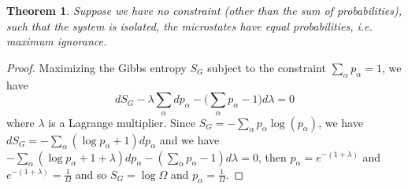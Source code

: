 \documentclass[a4paper]{article}
\theoremstyle{new}
\newtheorem{thm}{Theorem}[section]
\begin{document}
\begin{thm}
Suppose we have no constraint (other than the sum of probabilities), such that the system is isolated, the microstates have equal probabilities, i.e. maximum ignorance. 
\end{thm}
\begin{proof}
Maximizing the Gibbs entropy $S_G$ subject to the constraint $\sum_\alpha p_\alpha=1$, we have
$$dS_G-\lambda\sum_\alpha dp_\alpha-\bigg(\sum_\alpha p_\alpha-1\bigg)d\lambda=0$$
where $\lambda$ is a Lagrange multiplier. Since $S_G=-\sum_\alpha p_\alpha\log(p_\alpha)$, we have $dS_G=-\sum_\alpha(\log p_\alpha+1)dp_\alpha$ and we have $-\sum_\alpha(\log p_\alpha+1+\lambda)dp_\alpha-(\sum_\alpha p_\alpha-1)d\lambda=0$, then $p_\alpha=e^{-(1+\lambda)}$ and $e^{-(1+\lambda)}=\frac{1}{\Omega}$ and so $S_G=\log\Omega$ and $p_\alpha=\frac{1}{\Omega}$.
\end{proof}
\newpage
\end{document}
